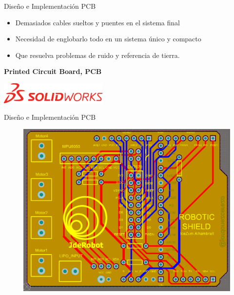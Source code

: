 \documentclass{beamer}
\begin{document}
\begin{frame}{Diseño e Implementación PCB}
\begin{block}{}
	\begin{itemize}
		\item Demasiados cables sueltos y puentes en el sistema final \pause
		\item Necesidad de englobarlo todo en un sistema único y compacto \pause
		\item Que resuelva problemas de ruido y referencia de tierra. \pause
	\end{itemize}
\end{block}
\begin{alertblock}{}
	\centering \textbf{Printed Circuit Board, PCB} \pause
	\begin{center}
		\includegraphics [width =0.4\textwidth ]{imagenes/SolidWorks-01}
	\end{center}
\end{alertblock}
\end{frame}

\begin{frame}{Diseño e Implementación PCB}
\begin{figure}[H]
	\center
	\includegraphics[scale=0.35, angle=0]{imagenes/Balancing_Robot/layers_altium.PNG}
\end{figure}
\end{frame}
\end{document}
